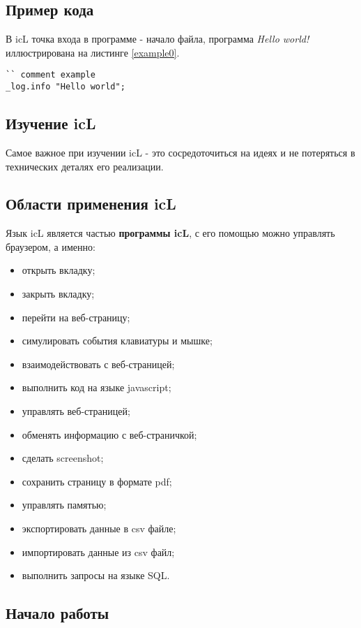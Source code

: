 \documentclass[a4paper, 14pt]{extarticle}
\newenvironment{icItems}
	{ \begin{itemize} [noitemsep,nolistsep] }
	{ \end{itemize} }
\begin{document}
\subsection{Пример кода}

В icL точка входа в программе - начало файла, программа \textit{Hello world!} иллюстрирована на листинге \ref{example0}.

\begin{lstlisting}[caption=Пример, label=example0]
`` comment example
_log.info "Hello world";
\end{lstlisting}

\subsection{Изучение icL}

Самое важное при изучении icL - это сосредоточиться на идеях и не потеряться в технических деталях его реализации.

\subsection{Области применения icL}

Язык icL является частью \textbf{программы icL}, с его помощью можно управлять браузером, а именно:
\begin{icItems}
\item
	открыть вкладку;
\item
	закрыть вкладку;
\item
	перейти на веб-страницу;
\item
	симулировать события клавиатуры и мышке;
\item
	взаимодействовать с веб-страницей;
\item
	выполнить код на языке javascript;
\item
	управлять веб-страницей;
\item
	обменять информацию с веб-страничкой;
\item
	сделать screenshot;
\item
	сохранить страницу в формате pdf;
\item
	управлять памятью;
\item
	экспортировать данные в csv файле;
\item
	импортировать данные из csv файл;
\item
	выполнить запросы на языке SQL.
\end{icItems}

\subsection{Начало работы}
\end{document}
